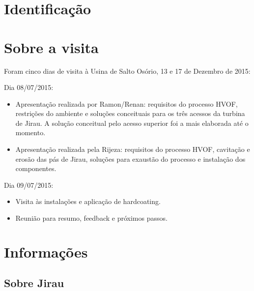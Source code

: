 \documentclass[12pt,a4paper]{article}
\begin{document}



\newpage%
\section{Identificação}



\newpage%
\section{Sobre a visita}
Foram cinco dias de visita à Usina de Salto Osório, 13 e 17 de Dezembro de 2015:

Dia 08/07/2015:
\begin{itemize}
  \item Apresentação realizada por Ramon/Renan: requisitos do processo HVOF,
  restrições do ambiente e soluções conceituais para os três acessos da turbina de
  Jirau. A solução conceitual pelo acesso superior foi a mais elaborada até
  o momento.
  \item Apresentação realizada pela Rijeza: requisitos do processo HVOF,
  cavitação e erosão das pás de Jirau, soluções para exaustão do processo e
  instalação dos componentes.
\end{itemize}

Dia 09/07/2015:
\begin{itemize}
  \item Visita às instalações e aplicação de hardcoating.
  \item Reunião para resumo, feedback e próximos passos.
\end{itemize}

\section{Informações}

\subsection{Sobre Jirau}
\end{document}
